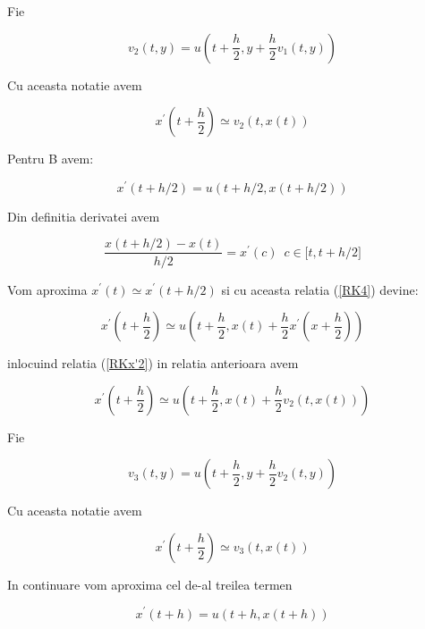 \documentclass[a4paper,twoside]{book}
\begin{document}
Fie

\begin{equation}
v_{2}(t,y)=u(t+\frac{h}{2},y+\frac{h}{2}v_{1}(t,y))  \label{RKv2}
\end{equation}

Cu aceasta notatie avem

\begin{equation}
x^{\prime }(t+\frac{h}{2})\simeq v_{2}(t,x(t))  \label{RKx'2}
\end{equation}

Pentru B avem:

\begin{equation}
x^{\prime }(t+h/2)=u(t+h/2,x(t+h/2))  \label{RK4}
\end{equation}

Din definitia derivatei avem

\begin{equation*}
\frac{x(t+h/2)-x(t)}{h/2}=x^{\prime }(c)\,\,\,c\in \lbrack t,t+h/2]
\end{equation*}

Vom aproxima $x^{\prime }(t)\simeq x^{\prime }(t+h/2)$ si cu aceasta relatia
(\ref{RK4}) devine:

\begin{equation*}
x^{\prime }(t+\frac{h}{2})\simeq u(t+\frac{h}{2},x(t)+\frac{h}{2}x^{\prime
}(x+\frac{h}{2}))
\end{equation*}

inlocuind relatia (\ref{RKx'2}) in relatia anterioara avem

\begin{equation*}
x^{\prime }(t+\frac{h}{2})\simeq u(t+\frac{h}{2},x(t)+\frac{h}{2}%
v_{2}(t,x(t)))
\end{equation*}

Fie

\begin{equation}
v_{3}(t,y)=u(t+\frac{h}{2},y+\frac{h}{2}v_{2}(t,y))  \label{RKv3}
\end{equation}

Cu aceasta notatie avem

\begin{equation}
x^{\prime }(t+\frac{h}{2})\simeq v_{3}(t,x(t))  \label{RKx'3}
\end{equation}

In continuare vom aproxima cel de-al treilea termen

\begin{equation*}
x^{\prime }(t+h)=u(t+h,x(t+h))
\end{equation*}
\end{document}
